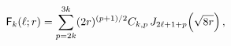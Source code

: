 \[{\sf F}_{k}(\ell;r)=\sum_{p=2k}^{3k}(2r)^{(p+1)/2}C_{k,p}\mathop{J_{2\ell+1+p}%
\/}\nolimits\!\left(\sqrt{8r}\right),\]